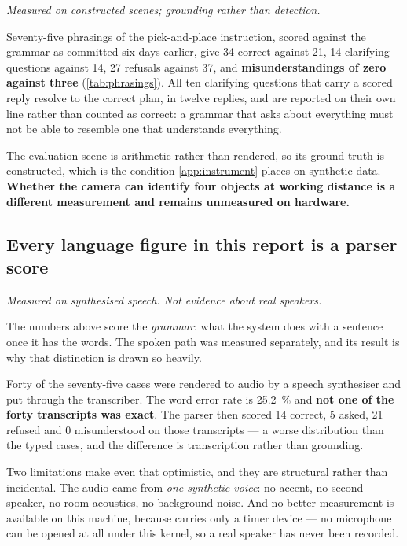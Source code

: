 \emph{Measured on constructed scenes; grounding rather than detection.}

Seventy-five phrasings of the pick-and-place instruction, scored against the
grammar as committed six days earlier, give 34 correct against 21, 14
clarifying questions against 14, 27 refusals against 37, and
\textbf{misunderstandings of zero against three}
(\cref{tab:phrasings}). All ten clarifying questions that carry a scored reply
resolve to the correct plan, in twelve replies, and are reported on their own
line rather than counted as correct: a grammar that asks about everything must
not be able to resemble one that understands everything.

The evaluation scene is arithmetic rather than rendered, so its ground truth
is constructed, which is the condition \cref{app:instrument} places on
synthetic data. \textbf{Whether the camera can identify four objects at
working distance is a different measurement and remains unmeasured on
hardware.}

\subsection{Every language figure in this report is a parser score}
\label{sec:voice-caveat}

\emph{Measured on synthesised speech. Not evidence about real speakers.}

The numbers above score the \emph{grammar}: what the system does with a
sentence once it has the words. The spoken path was measured separately, and
its result is why that distinction is drawn so heavily.

Forty of the seventy-five cases were rendered to audio by a speech synthesiser
and put through the transcriber. The word error rate is \SI{25.2}{\percent}
and \textbf{not one of the forty transcripts was exact}. The parser then
scored 14 correct, 5 asked, 21 refused and 0 misunderstood on those
transcripts --- a worse distribution than the typed cases, and the difference
is transcription rather than grounding.

Two limitations make even that optimistic, and they are structural rather than
incidental. The audio came from \emph{one synthetic voice}: no accent, no
second speaker, no room acoustics, no background noise. And no better
measurement is available on this machine, because  carries only
a timer device --- no microphone can be opened at all under this kernel, so a
real speaker has never been recorded.

